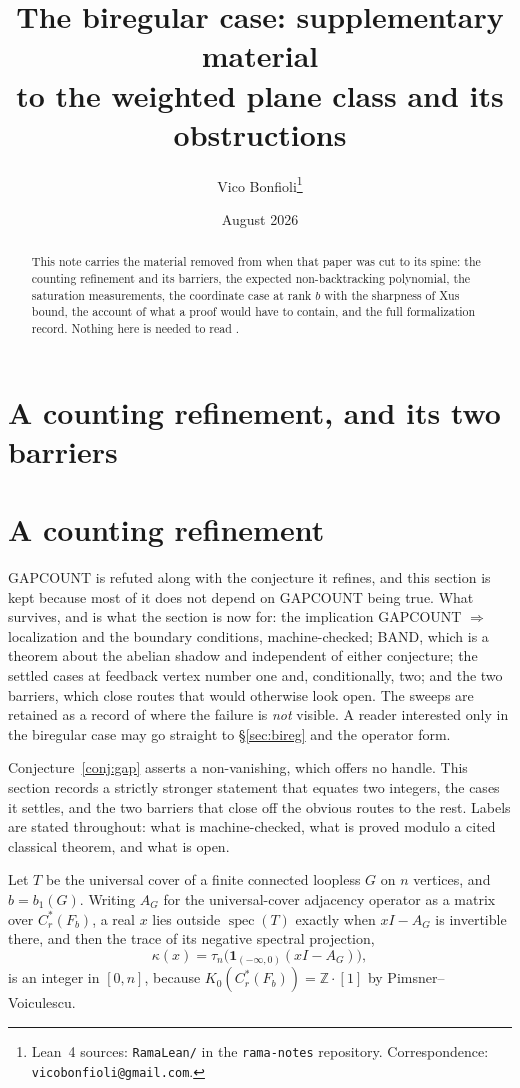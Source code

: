 \documentclass[11pt]{article}
\title{The biregular case: supplementary material\\
to the weighted plane class and its obstructions}
\author{Vico Bonfioli\thanks{Lean~4 sources: \texttt{RamaLean/} in the \texttt{rama-notes} repository. Correspondence: \texttt{vicobonfioli@gmail.com}.}}
\date{August 2026}
\theoremstyle{remark}
\begin{document}
\maketitle

\begin{abstract}
This note carries the material removed from \cite{PartII} when that paper was cut to its
spine: the counting refinement and its barriers, the expected non-backtracking polynomial,
the saturation measurements, the coordinate case at rank $b$ with the sharpness of Xus
bound, the account of what a proof would have to contain, and the full formalization record.
Nothing here is needed to read \cite{PartII}.
\end{abstract}


\section{A counting refinement, and its two barriers}

\section{A counting refinement}\label{sec:gapcount}

GAPCOUNT is refuted along with the conjecture it refines, and this section is kept because most
of it does not depend on GAPCOUNT being true. What survives, and is what the section is now for:
the implication GAPCOUNT $\Rightarrow$ localization and the boundary conditions, machine-checked;
BAND, which is a theorem about the abelian shadow and independent of either conjecture; the
settled cases at feedback vertex number one and, conditionally, two; and the two barriers, which
close routes that would otherwise look open. The sweeps are retained as a record of where the
failure is \emph{not} visible. A reader interested only in the biregular case may go straight to
\S\ref{sec:bireg} and the operator form.

Conjecture~\ref{conj:gap} asserts a non-vanishing, which offers no handle. This section
records a strictly stronger statement that equates two integers, the cases it settles, and
the two barriers that close off the obvious routes to the rest. Labels are stated
throughout: what is machine-checked, what is proved modulo a cited classical theorem, and
what is open.

Let $T$ be the universal cover of a finite connected loopless $G$ on $n$ vertices, and
$b=b_1(G)$. Writing $A_G$ for the universal-cover adjacency operator as a matrix over
$C^*_r(F_b)$, a real $x$ lies outside $\operatorname{spec}(T)$ exactly when $xI-A_G$ is
invertible there, and then the trace of its negative spectral projection,
\[
\kappa(x)=\tau_n\bigl(\mathbf 1_{(-\infty,0)}(xI-A_G)\bigr),
\]
is an integer in $[0,n]$, because $K_0(C^*_r(F_b))=\mathbb{Z}\cdot[1]$ by Pimsner--Voiculescu.
\end{document}

